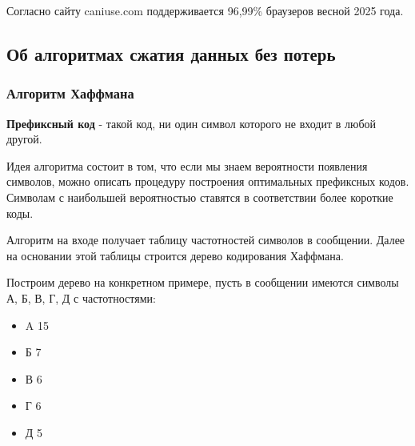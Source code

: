 \documentclass[12pt]{article}
\begin{document}
Согласно сайту caniuse.com поддерживается 96,99\% браузеров весной 2025 года.

\subsection{Об алгоритмах сжатия данных без потерь}

\subsubsection{Алгоритм Хаффмана}

\textbf{Префиксный код} - такой код, ни один символ которого не входит в любой другой.

Идея алгоритма состоит в том, что если мы знаем вероятности появления символов,
можно описать процедуру построения оптимальных префиксных кодов.
Символам с наибольшей вероятностью ставятся в соответствии более короткие коды.

Алгоритм на входе получает таблицу частотностей символов в сообщении.
Далее на основании этой таблицы строится дерево кодирования Хаффмана.

Построим дерево на конкретном примере, пусть в сообщении имеются символы А, Б, В, Г, Д с частотностями:

\begin{itemize}
    \item A 15
    \item Б 7
    \item В 6
    \item Г 6
    \item Д 5
\end{itemize}
\end{document}
